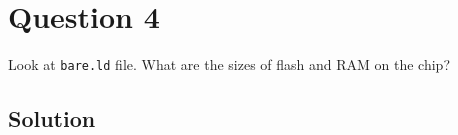 \section*{Question 4}

Look at \texttt{bare.ld} file.
What are the sizes of flash and RAM on the chip?

\subsection*{Solution}
